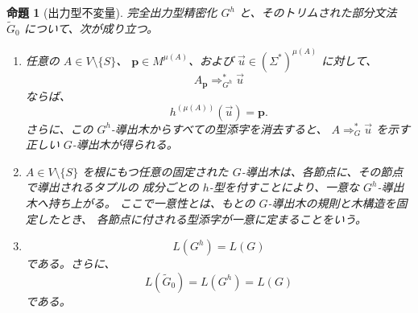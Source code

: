 \documentclass[11pt,a4paper]{ltjsarticle}
\newtheorem{proposition}[theorem]{命題}
\theoremstyle{remark}
\newcommand{\tuple}[1]{\vec{#1}}
\begin{document}
\begin{proposition}[出力型不変量]
\label{prop:output-invariants}
完全出力型精密化 \(G^h\) と、そのトリムされた部分文法
\(\widetilde G_0\) について、次が成り立つ。
\begin{enumerate}[label=(\roman*),leftmargin=*]
\item 任意の \(A\in V\setminus\{S\}\)、
      \(\mathbf p\in M^{\mu(A)}\)、および
      \(\tuple u\in(\Sigma^*)^{\mu(A)}\) に対して、
      \[
        A_{\mathbf p}\Rightarrow_{G^h}^*\tuple u
      \]
      ならば、
      \[
        h^{(\mu(A))}(\tuple u)=\mathbf p.
      \]
      さらに、この \(G^h\)-導出木からすべての型添字を消去すると、
      \(A\Rightarrow_G^*\tuple u\) を示す正しい \(G\)-導出木が得られる。

\item \(A\in V\setminus\{S\}\) を根にもつ任意の固定された
      \(G\)-導出木は、各節点に、その節点で導出されるタプルの
      成分ごとの \(h\)-型を付すことにより、一意な
      \(G^h\)-導出木へ持ち上がる。
      ここで一意性とは、もとの \(G\)-導出木の規則と木構造を固定したとき、
      各節点に付される型添字が一意に定まることをいう。

\item
      \[
        L(G^h)=L(G)
      \]
      である。さらに、
      \[
        L(\widetilde G_0)=L(G^h)=L(G)
      \]
      である。
\end{enumerate}
\end{proposition}
\end{document}
